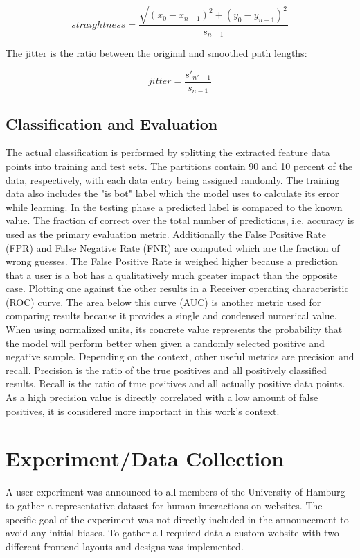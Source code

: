 \documentclass[
    fontsize=12pt,
    headings=small,
    parskip=half,           %
    bibliography=totoc,
    numbers=noenddot,       %
    open=any,               %
    final,                   %
    table
]{scrreprt}
\begin{document}
\[
straightness = \frac{ \sqrt{ (x_0 - x_{n-1})^2 + (y_0 - y_{n-1})^2 } }{s_{n-1}}
\]

The jitter is the ratio between the original and smoothed path lengths:

\[
jitter = \frac{s'_{n'-1}}{s_{n-1}}
\]



\subsection{Classification and Evaluation}

The actual classification is performed by splitting the extracted feature data points into training and test sets. The partitions contain 90 and 10 percent of the data, respectively, with each data entry being assigned randomly. The training data also includes the "is bot" label which the model uses to calculate its error while learning. In the testing phase a predicted label is compared to the known value. The fraction of correct over the total number of predictions, i.e. accuracy is used as the primary evaluation metric. Additionally the False Positive Rate (FPR) and False Negative Rate (FNR) are computed which are the fraction of wrong guesses. The False Positive Rate is weighed higher because a prediction that a user is a bot has a qualitatively much greater impact than the opposite case. Plotting one against the other results in a Receiver operating characteristic (ROC) curve. The area below this curve (AUC) is another metric used for comparing results because it provides a single and condensed numerical value. When using normalized units, its concrete value represents the probability that the model will perform better when given a randomly selected positive and negative sample.\cite{FAWCETT2006861} Depending on the context, other useful metrics are precision and recall. Precision is the ratio of the true positives and all positively classified results. Recall is the ratio of true positives and all actually positive data points. As a high precision value is directly correlated with a low amount of false positives, it is considered more important in this work's context.

\section{Experiment/Data Collection}

A user experiment was announced to all members of the University of Hamburg to gather a representative dataset for human interactions on websites. The specific goal of the experiment was not directly included in the announcement to avoid any initial biases. To gather all required data a custom website with two different frontend layouts and designs was implemented.
\end{document}
